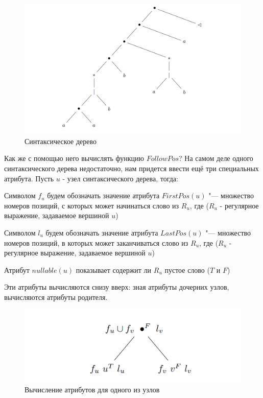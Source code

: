 \begin{multicols}{2}
\begin{figure}[h!tp]
    \centering
    \includegraphics[scale=0.5]{images/SintTree.PNG}
    \caption{Синтаксическое дерево}
    \label{fig:SyntaxTree1}
\end{figure}

Как же с помощью него вычислять функцию $FollowPos$? На самом деле одного синтаксического дерева недостаточно, нам придется ввести ещё три специальных атрибута. Пусть $u$ - узел синтаксического дерева, тогда:
\begin{definition}Символом $f_{u}$ будем обозначать значение атрибута $FirstPos(u)$ "--- множество номеров позиций, с которых может начинаться слово из $R_u$, где ($R_u$ - регулярное выражение, задаваемое вершиной $u$) \end{definition}

\begin{definition}
    Символом $l_{u}$ будем обозначать значение атрибута $LastPos(u)$ "--- множество номеров позиций, в которых может заканчиваться слово из $R_u$, где ($R_u$ - регулярное выражение, задаваемое вершиной $u$)
\end{definition}

\begin{definition}
    Атрибут $nullable(u)$ показывает содержит ли $R_u$ пустое слово ($T$ и $F$)
\end{definition}

Эти атрибуты вычисляются снизу вверх: зная атрибуты дочерних
узлов, вычисляются атрибуты родителя.
\begin{figure}[h!tp]
    \centering
    \includegraphics[scale=0.5]{images/7.PNG}
    \caption{Вычисление атрибутов для одного из узлов}
    \label{fig:SampleNode}
\end{figure}


\end{multicols}
